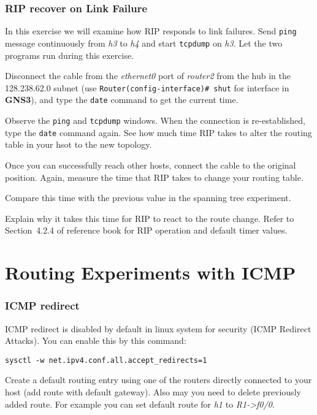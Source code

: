 \documentclass{../UTNetLab}
\begin{document}
\section{RIP recover on Link Failure}
    In this exercise we will examine how RIP responds to link failures.
    Send \lstinline{ping} message continuously from \textit{h3} to \textit{h4} and start \lstinline{tcpdump} on \textit{h3}.
    Let the two programs run during this exercise.

    Disconnect the cable from the \textit{ethernet0} port of \textit{router2} from the hub in the 128.238.62.0 subnet (use \lstinline[language={cisco}]{Router(config-interface)# shut} for interface in \textbf{GNS3}), and type the \lstinline{date} command to get the current time.

    Observe the \lstinline{ping} and \lstinline{tcpdump} windows.
    When the connection is re-established, type the \lstinline{date} command again.
    See how much time RIP takes to alter the routing table in your hsot to the new topology.

    Once you can successfully reach other hosts, connect the cable to the original position.
    Again, measure the time that RIP takes to change your routing table.
    
    \begin{report}
    \item Compare this time with the previous value in the spanning tree experiment.

    \item Explain why it takes this time for RIP to react to the route change.
        Refer to Section~4.2.4 of reference book for RIP operation and default timer values.
    \end{report}


\part{Routing Experiments with ICMP}
\section{ICMP redirect}
    ICMP redirect is disabled by default in linux system for security (ICMP Redirect Attacks).
    You can enable this by this command:
    \begin{lstlisting}
sysctl -w net.ipv4.conf.all.accept_redirects=1
    \end{lstlisting}

    Create a default routing entry using one of the routers directly connected to your host (add route with default gateway).
    Also may you need to delete previously added route.
    For example you can set default route for \textit{h1} to \textit{R1->f0/0}.
\end{document}
